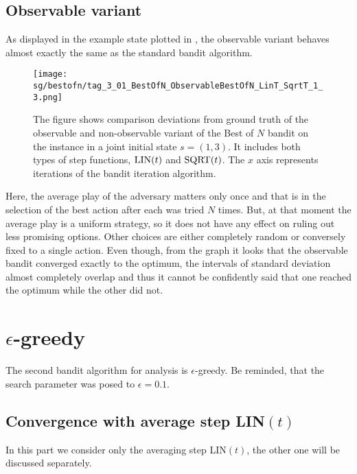 \documentclass[../main.tex]{subfiles}
\begin{document}
\subsection{Observable variant}
As displayed in the example state plotted in , the observable variant behaves almost exactly the same as the standard bandit algorithm.
\begin{figure}[ht]
    \texttt{[image: sg/bestofn/tag\_3\_01\_BestOfN\_ObservableBestOfN\_LinT\_SqrtT\_1\_3.png]}
    \caption[Comparison of standard and observable Best of $N$ bandit]{
        The figure shows comparison deviations from ground truth of the observable and non-observable variant of the Best of $N$ bandit on the instance  in a joint initial state $s = \left(1, 3\right)$.
        It includes both types of step functions, $\text{LIN}(t)$ and $\text{SQRT}(t)$.
        The $x$ axis represents iterations of the bandit iteration algorithm.
    }
    \label{apx:sgexp:bestofn:fig:obs}
\end{figure}
Here, the average play of the adversary matters only once and that is in the selection of the best action after each was tried $N$ times.
But, at that moment the average play is a uniform strategy, so it does not have any effect on ruling out less promising options. 
Other choices are either completely random or conversely fixed to a single action.
Even though, from the graph it looks that the observable bandit converged exactly to the optimum, the intervals of standard deviation almost completely overlap and thus it cannot be confidently said that one reached the optimum while the other did not.

\section{$\epsilon$-greedy}\label{apx:sgexp:eps}
The second bandit algorithm for analysis is $\epsilon$-greedy.
Be reminded, that the search parameter was posed to $\epsilon = 0.1$.

\subsection{Convergence with average step LIN$(t)$}
In this part we consider only the averaging step LIN$(t)$, the other one will be discussed separately.
\end{document}
